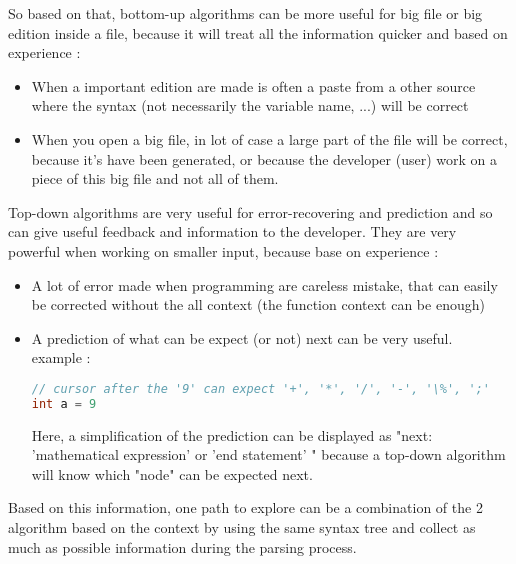 So based on that, bottom-up algorithms can be more useful for big file or big edition inside a file, because it will treat all the information quicker and based on experience :
\begin{itemize}
\item When a important edition are made is often a paste from a other source where the syntax (not necessarily the variable name, ...) will be correct
\item When you open a big file, in lot of case a large part of the file will be correct, because it's have been generated, or because the developer (user) work on a piece of this big file and not all of them.
\end{itemize}

Top-down algorithms are very useful for error-recovering and prediction and so can give useful feedback and information to the developer. They are very powerful when working on smaller input, because base on experience :
\begin{itemize}
\item A lot of error made when programming are careless mistake, that can easily be corrected without the all context (the function context can be enough)
\item A prediction of what can be expect (or not) next can be very useful.
\\ example :
\begin{lstlisting}[language=C++, caption=simple prediction example in C]
// cursor after the '9' can expect '+', '*', '/', '-', '\%', ';'
int a = 9 
\end{lstlisting}
Here, a simplification of the prediction can be displayed as "next: 'mathematical expression' or 'end statement' " because a top-down algorithm will know which "node" can be expected next.
\end{itemize}
Based on this information, one path to explore can be a combination of the 2 algorithm based on the context by using the same syntax tree and collect as much as possible information during the parsing process.